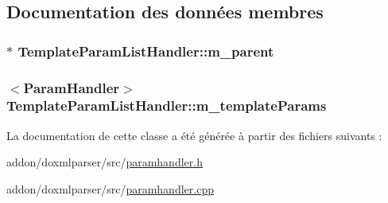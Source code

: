 \subsection{Documentation des données membres}
\hypertarget{class_template_param_list_handler_a110623f362f29fb25579061a059112cb}{}
\subsubsection[{m\+\_\+parent}]{$\ast$ Template\+Param\+List\+Handler\+::m\+\_\+parent\hspace{0.3cm}{\ttfamily [protected]}}\label{class_template_param_list_handler_a110623f362f29fb25579061a059112cb}
\hypertarget{class_template_param_list_handler_afd9eea40dd51eef37c2e02efae0e78d7}{}
\subsubsection[{m\+\_\+template\+Params}]{$<${\bf Param\+Handler}$>$ Template\+Param\+List\+Handler\+::m\+\_\+template\+Params\hspace{0.3cm}{\ttfamily [protected]}}\label{class_template_param_list_handler_afd9eea40dd51eef37c2e02efae0e78d7}


La documentation de cette classe a été générée à partir des fichiers suivants \+:\begin{DoxyCompactItemize}
\item 
addon/doxmlparser/src/\hyperlink{paramhandler_8h}{paramhandler.\+h}\item 
addon/doxmlparser/src/\hyperlink{paramhandler_8cpp}{paramhandler.\+cpp}\end{DoxyCompactItemize}
